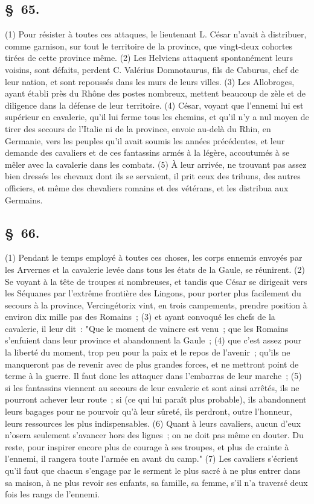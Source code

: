 \documentclass[french,twoside]{book} %
\begin{document}
\subsection[{§ 65.}]{ \textsc{§ 65.} }
\noindent (1) Pour résister à toutes ces attaques, le lieutenant L. César n’avait à distribuer, comme garnison, sur tout le territoire de la province, que vingt-deux cohortes tirées de cette province même. (2) Les Helviens attaquent spontanément leurs voisins, sont défaits, perdent C. Valérius Domnotaurus, fils de Caburus, chef de leur nation, et sont repoussés dans les murs de leurs villes. (3) Les Allobroges, ayant établi près du Rhône des postes nombreux, mettent beaucoup de zèle et de diligence dans la défense de leur territoire. (4) César, voyant que l’ennemi lui est supérieur en cavalerie, qu’il lui ferme tous les chemins, et qu’il n’y a nul moyen de tirer des secours de l’Italie ni de la province, envoie au-delà du Rhin, en Germanie, vers les peuples qu’il avait soumis les années précédentes, et leur demande des cavaliers et de ces fantassins armés à la légère, accoutumés à se mêler avec la cavalerie dans les combats. (5) À leur arrivée, ne trouvant pas assez bien dressés les chevaux dont ils se servaient, il prit ceux des tribuns, des autres officiers, et même des chevaliers romains et des vétérans, et les distribua aux Germains.
\subsection[{§ 66.}]{ \textsc{§ 66.} }
\noindent (1) Pendant le temps employé à toutes ces choses, les corps ennemis envoyés par les Arvernes et la cavalerie levée dans tous les états de la Gaule, se réunirent. (2) Se voyant à la tête de troupes si nombreuses, et tandis que César se dirigeait vers les Séquanes par l’extrême frontière des Lingons, pour porter plus facilement du secours à la province, Vercingétorix vint, en trois campements, prendre position à environ dix mille pas des Romains ; (3) et ayant convoqué les chefs de la cavalerie, il leur dit : "Que le moment de vaincre est venu ; que les Romains s’enfuient dans leur province et abandonnent la Gaule ; (4) que c’est assez pour la liberté du moment, trop peu pour la paix et le repos de l’avenir ; qu’ils ne manqueront pas de revenir avec de plus grandes forces, et ne mettront point de terme à la guerre. Il faut donc les attaquer dans l’embarras de leur marche ; (5) si les fantassins viennent au secours de leur cavalerie et sont ainsi arrêtés, ils ne pourront achever leur route ; si (ce qui lui paraît plus probable), ils abandonnent leurs bagages pour ne pourvoir qu’à leur sûreté, ils perdront, outre l’honneur, leurs ressources les plus indispensables. (6) Quant à leurs cavaliers, aucun d’eux n’osera seulement s’avancer hors des lignes ; on ne doit pas même en douter. Du reste, pour inspirer encore plus de courage à ses troupes, et plus de crainte à l’ennemi, il rangera toute l’armée en avant du camp." (7) Les cavaliers s’écrient qu’il faut que chacun s’engage par le serment le plus sacré à ne plus entrer dans sa maison, à ne plus revoir ses enfants, sa famille, sa femme, s’il n’a traversé deux fois les rangs de l’ennemi.
\end{document}
